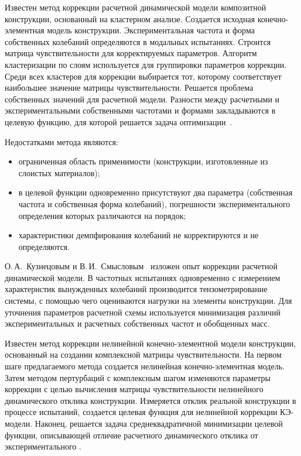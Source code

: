 Известен метод коррекции расчетной динамической модели композитной конструкции, основанный на кластерном анализе. Создается исходная конечно-элементная модель конструкции. Экспериментальная частота и форма собственных колебаний определяются в модальных испытаниях. Строится матрица чувствительности для корректируемых параметров. Алгоритм кластеризации по слоям используется для группировки параметров коррекции. Среди всех кластеров для коррекции выбирается тот, которому соответствует наибольшее значение матрицы чувствительности. Решается проблема собственных значений для расчетной модели. Разности между расчетными и экспериментальными собственными частотами и формами закладываются в целевую функцию, для которой решается задача оптимизации~\cite{lib:modelUpdating:CN107357992A}.

Недостатками метода являются: 
\begin{itemize}
	\item ограниченная область применимости (конструкции, изготовленные из слоистых материалов); 
	\item в целевой функции одновременно присутствуют два параметра (собственная частота и собственная форма колебаний), погрешности экспериментального определения которых различаются на порядок; 
	\item характеристики демпфирования колебаний не корректируются и не определяются. 
\end{itemize}

О.\,А.~Кузнецовым и В.\,И.~Смысловым~\cite{lib:modelUpdating:Kuznetsov} изложен опыт коррекции расчетной динамической модели. В частотных испытаниях одновременно с измерением характеристик вынужденных колебаний производится тензометрирование системы, с помощью чего оцениваются нагрузки на элементы конструкции. Для уточнения параметров расчетной схемы используется минимизация различий экспериментальных и расчетных собственных частот и обобщенных масс.

Известен метод коррекции нелинейной конечно-элементной модели конструкции, основанный на создании комплексной матрицы чувствительности. На первом шаге предлагаемого метода создается нелинейная конечно-элементная модель. Затем методом пертурбаций с комплексным шагом изменяются параметры коррекции с целью вычисления матрицы чувствительности нелинейного динамического отклика конструкции. Измеряется отклик реальной конструкции в процессе испытаний, создается целевая функция для нелинейной коррекции КЭ-модели. Наконец, решается задача среднеквадратичной минимизации целевой функции, описывающей отличие расчетного динамического отклика от экспериментального \cite{lib:modelUpdating:CN109885896A}. 

